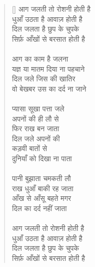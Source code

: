 \begin{verse}[\versewidth]\texthindi{
आग जलती तो रोशनी होती है\\
धुआँ उठता है आवाज़ होती है\\
दिल जलता है छुप के चुपके\\
सिर्फ़ आँखों से बरसात होती है\\
\\
आग का काम है जलना\\
यज्ञ या मातम दिया ना पहचाने\\
दिल जले जिस की खातिर\\
वो बेखबर उस का दर्द ना जाने\\
\\
प्यासा सूखा पत्ता जले\\
अपनों की ही लौ से\\
फिर राख बन जाता\\
दिल जले अपनों की\\
कड़वी बातों से\\
दुनियाँ को दिखा ना पाता\\
\\
पानी बुझाता चमकती लौ\\
राख धुआँ बाकी रह जाता\\
आँख से आँसू बहते मगर\\
दिल का दर्द नहीं जाता\\
\\
आग जलती तो रोशनी होती है\\
धुआँ उठता है आवाज़ होती है\\
दिल जलता है छुप के चुपके\\
सिर्फ़ आँखों से बरसात होती है
}\end{verse}

